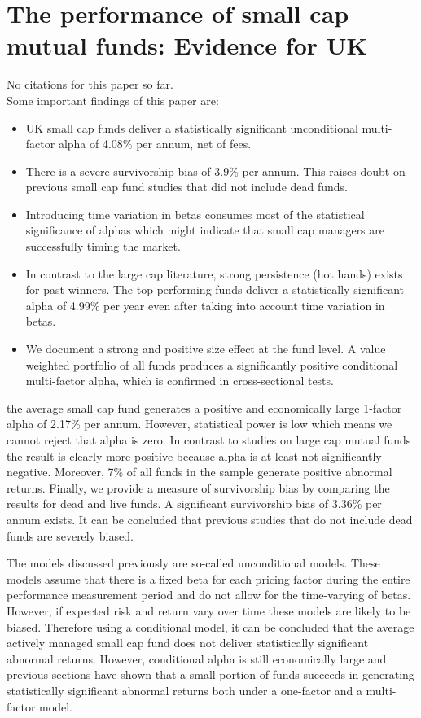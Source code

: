 \documentclass[12 pt]{article}
\begin{document}
\section{The performance of small cap mutual funds: Evidence for UK}
No citations for this paper so far.\\
Some important findings of this paper are: 
\begin{itemize}
\item UK small cap funds deliver a statistically significant unconditional multi-factor alpha of 4.08\% per annum, net of fees. 
\item There is a severe survivorship bias of 3.9\% per annum. This raises doubt on previous small cap fund studies that did not include dead funds.
\item Introducing time variation in betas consumes most of the statistical significance of alphas which might indicate that small cap
managers are successfully timing the market.
\item In contrast to the large cap literature, strong persistence (hot hands) exists for past winners. The top performing funds deliver a
statistically significant alpha of 4.99\% per year even after taking into account time variation in betas.
\item We document a strong and positive size effect at the fund level. A value weighted portfolio of all funds produces a significantly positive conditional multi-factor alpha, which is confirmed in cross-sectional tests.
\end{itemize}
the average small cap fund generates a positive and economically large 1-factor alpha of 2.17\% per annum. However, statistical power is low which means we cannot reject that alpha is zero. In contrast to studies on large cap mutual funds the result is clearly more positive because alpha is at least not significantly negative. Moreover, 7\% of all funds in the sample generate positive abnormal returns. Finally, we provide a measure of survivorship bias by comparing the results for dead and live funds. A significant survivorship bias of 3.36\% per annum exists. It can be concluded that previous studies that do not include dead funds are severely biased.
\par The models discussed previously are so-called unconditional models. These models assume that there is a fixed beta for each pricing factor during the entire performance measurement period and do not allow for the time-varying of betas. However, if expected risk and return vary over time these models are likely to be biased. Therefore using a conditional model, it can be concluded that the average actively managed small cap fund does not deliver statistically significant abnormal returns. However, conditional alpha is still economically large and previous sections have shown that a small portion of funds succeeds in generating statistically significant abnormal returns both under a one-factor and a multi-factor model.
\end{document}
